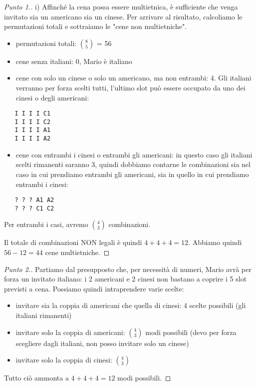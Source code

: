 \documentclass[12pt]{article}
\renewcommand\qedsymbol{$\blacksquare$}
\begin{document}
\renewcommand\qedsymbol{$\square$}

\begin{proof}[Punto 1.]
i) Affinché la cena possa essere multietnica, è sufficiente che venga invitato sia un americano sia un cinese. Per arrivare al risultato, calcoliamo le permutazioni totali e sottraiamo le "cene non multietniche".

\begin{itemize}
\item permutazioni totali: ${8 \choose 5}$ = 56
\item cene senza italiani: 0, Mario è italiano
\item cene con solo un cinese o solo un americano, ma non entrambi: 4. Gli italiani verranno per forza scelti tutti, l'ultimo slot può essere occupato da uno dei cinesi o degli americani:
\end{itemize}

\begin{verbatim}
   I I I I C1
   I I I I C2
   I I I I A1
   I I I I A2
\end{verbatim}

\begin{itemize}
     \item cene con entrambi i cinesi o entrambi gli americani: in questo caso gli italiani scelti rimanenti saranno 3, quindi dobbiamo contarne le combinazioni sia nel caso in cui prendiamo entrambi gli americani, sia in quello in cui prendiamo entrambi i cinesi:
\end{itemize}

\begin{verbatim}
   ? ? ? A1 A2
   ? ? ? C1 C2
\end{verbatim}

Per entrambi i casi, avremo ${4 \choose 3}$ combinazioni.

Il totale di combinazioni NON legali è quindi $4 + 4 + 4 = 12$. Abbiamo quindi $56 - 12 = 44$ cene multietniche. \end{proof}

\renewcommand\qedsymbol{$\blacksquare$}

\begin{proof}[Punto 2.]
Partiamo dal presupposto che, per necessità di numeri, Mario avrà per forza un invitato italiano: i 2 americani e 2 cinesi non bastano a coprire i 5 slot previsti a cena. Possiamo quindi intraprendere varie scelte:

\begin{itemize}
     \item invitare sia la coppia di americani che quella di cinesi: 4 scelte possibili (gli italiani rimanenti)
     \item invitare solo la coppia di americani: ${4 \choose 3}$ modi possibili (devo per forza scegliere dagli italiani, non posso invitare solo un cinese)
     \item invitare solo la coppia di cinesi: ${4 \choose 3}$
\end{itemize}

Tutto ciò ammonta a $4 + 4 + 4 = 12$  modi possibili.

\end{proof}
\end{document}
